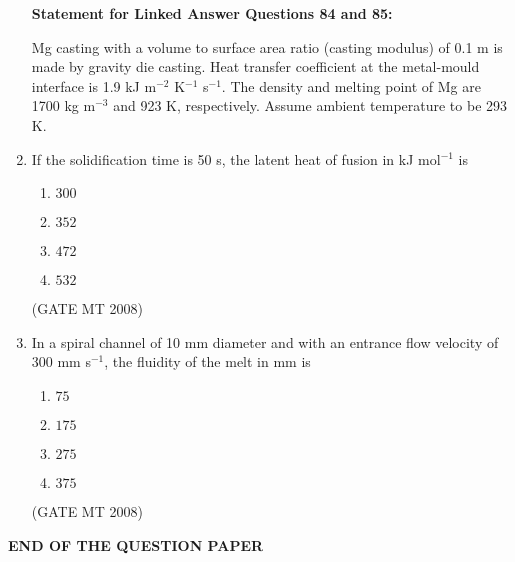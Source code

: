 \documentclass[journal, 11pt, onecolumn]{IEEEtran}
\theoremstyle{remark}
\begin{document}
\begin{enumerate}
\textbf{Statement for Linked Answer Questions 84 and 85:}

Mg casting with a volume to surface area ratio (casting modulus) of 0.1 m is made by gravity die casting.
Heat transfer coefficient at the metal-mould interface is 1.9 kJ m$^{-2}$ K$^{-1}$ s$^{-1}$. 
The density and melting point of Mg are 1700 kg m$^{-3}$ and 923 K, respectively. 
Assume ambient temperature to be 293 K.

\item If the solidification time is 50 s, the latent heat of fusion in kJ mol$^{-1}$ is

\begin{multicols}{4}
\begin{enumerate} 
\item $300$
\item $352$
\item $472$
\item $532$
\end{enumerate}
\end{multicols}

\hfill(GATE MT 2008)

\item In a spiral channel of 10 mm diameter and with an entrance flow velocity of 300 mm s$^{-1}$, the fluidity of the melt in mm is
\vspace{-0.9em}
\begin{multicols}{4}
\begin{enumerate} 
\item $75$
\item $175$
\item $275$
\item $375$
\end{enumerate}
\end{multicols}
\hfill(GATE MT 2008)
\end{enumerate}

\textbf{END OF THE QUESTION PAPER}
\end{document}
